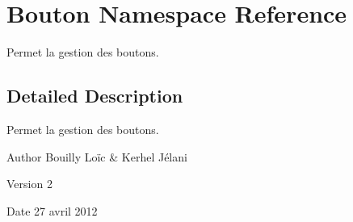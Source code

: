 \hypertarget{namespace_bouton}{\section{\-Bouton \-Namespace \-Reference}
\label{namespace_bouton}
}


\-Permet la gestion des boutons.  




\subsection{\-Detailed \-Description}
\-Permet la gestion des boutons. \begin{DoxyAuthor}{\-Author}
\-Bouilly \-Loïc \& \-Kerhel \-Jélani 
\end{DoxyAuthor}
\begin{DoxyVersion}{\-Version}
2 
\end{DoxyVersion}
\begin{DoxyDate}{\-Date}
27 avril 2012 
\end{DoxyDate}
